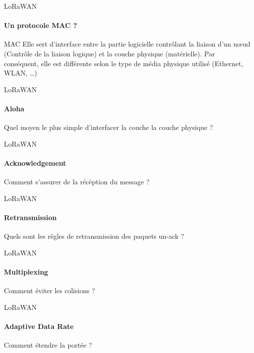 \begin{frame}{LoRaWAN}
\framesubtitle{Un protocole MAC ?}

\begin{block}{MAC}
Elle sert d'interface entre la partie logicielle contrôlant la 
liaison d'un nœud (Contrôle de la liaison logique) et la couche 
physique (matérielle). Par conséquent, elle est différente selon 
le type de média physique utilisé (Ethernet, WLAN, …)
\end{block}

\end{frame}

\begin{frame}{LoRaWAN}
\framesubtitle{Aloha}
\begin{block}{}
{
  Quel moyen le plus simple d'interfacer la couche la couche physique ?
}
\end{block}

\end{frame}

\begin{frame}{LoRaWAN}
\framesubtitle{Acknowledgement}
\begin{block}{}
{
  Comment s'assurer de la récèption du message ?
}
\end{block}

\end{frame}

\begin{frame}{LoRaWAN}
\framesubtitle{Retransmission}
\begin{block}{}
{
  Quels sont les rêgles de retransmission des paquets un-ack ?
}
\end{block}

\end{frame}

\begin{frame}{LoRaWAN}
\framesubtitle{Multiplexing}
\begin{block}{}
{
  Comment éviter les colisions ?
}
\end{block}

\end{frame}

\begin{frame}{LoRaWAN}
\framesubtitle{Adaptive Data Rate}
\begin{block}{}
{
  Comment étendre la portée ?
}
\end{block}

\end{frame}

